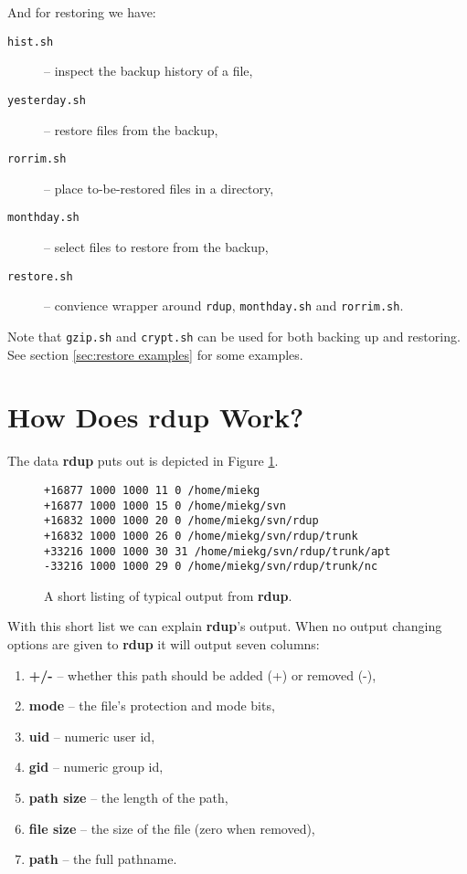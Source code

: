 \documentclass[a4paper, openany]{memoir}
\newcommand{\rdup}{\textbf{rdup}}
\newcommand{\cmd}[1]{\texttt{#1}}
\begin{document}
And for restoring we have:
\begin{description}
\item[\cmd{hist.sh}]{-- inspect the backup history of a file,}
\item[\cmd{yesterday.sh}]{-- restore files from the backup,}
\item[\cmd{rorrim.sh}]{-- place to-be-restored files in a directory,}
\item[\cmd{monthday.sh}]{-- select files to restore from the backup,}
\item[\cmd{restore.sh}]{-- convience wrapper around \cmd{rdup},
\cmd{monthday.sh} and \cmd{rorrim.sh}.} 
\end{description}

Note that \cmd{gzip.sh} and \cmd{crypt.sh} can be used for 
both backing up and restoring. See section \ref{sec:restore examples}
for some examples.

\section{How Does \rdup{} Work?}
The data \rdup{} puts out is depicted in Figure \ref{fig:rdup output}.
\begin{figure}[hbt]
\begin{verbatim}
+16877 1000 1000 11 0 /home/miekg
+16877 1000 1000 15 0 /home/miekg/svn
+16832 1000 1000 20 0 /home/miekg/svn/rdup
+16832 1000 1000 26 0 /home/miekg/svn/rdup/trunk
+33216 1000 1000 30 31 /home/miekg/svn/rdup/trunk/apt
-33216 1000 1000 29 0 /home/miekg/svn/rdup/trunk/nc
\end{verbatim}
\caption{A short listing of typical output from \rdup.}
\label{fig:rdup output}
\end{figure}

With this short list we can explain \rdup's output. When no
output changing options are given to \rdup{} it will output seven
columns:
\begin{enumerate}
\item{\textbf{+/-} -- whether this path should be added (+) or removed
(-),}
\item{\textbf{mode} -- the file's protection and mode bits,}
\item{\textbf{uid} -- numeric user id,}
\item{\textbf{gid} -- numeric group id,}
\item{\textbf{path size} -- the length of the path,}
\item{\textbf{file size} -- the size of the file (zero when removed),}
\item{\textbf{path} -- the full pathname.}
\end{enumerate}
\end{document}

